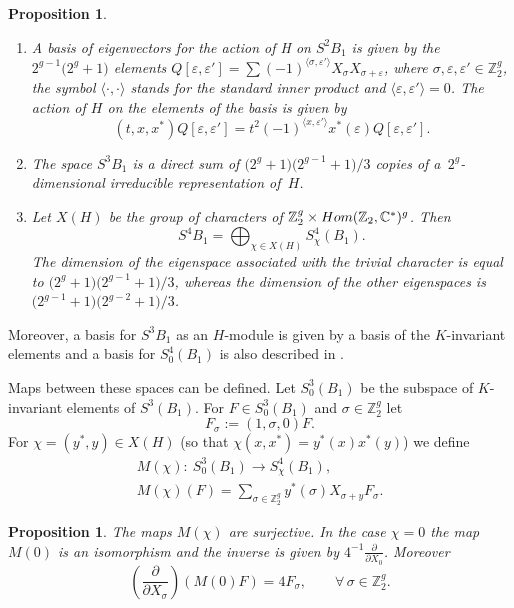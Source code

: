 \documentclass[11pt]{article}
\numberwithin{equation}{section}
\numberwithin{equation}{section}
\newtheorem{Proposition}[Theorem]{Proposition}
{ \theoremstyle{definition}
\newtheorem{Remark}[Theorem]{Remark} }
\newcommand{\ep}{\varepsilon}
\newcommand{\CC}{{\mathbb{C}}}
\newcommand{\ZZ}{{\mathbb{Z}}}
\def\ZZ{{\mathbb Z}}
\def\s{\sigma}
\begin{document}
\begin{Proposition}\label{pr.vG1}\quad
\begin{enumerate}\itemsep=0pt
\item[$(i)$] A basis of eigenvectors for the action of H on $S^2B_1$ is given by the $2^{g-1}\big( 2^{g}+1\big)$ elements $Q[\ep, \ep']=\sum(-1)^{\langle \s,\ep'\rangle}X_{\s}X_{\s+\ep}$, where $\s, \ep, \ep'\in\ZZ_2^g$, the symbol $\langle \cdot,\cdot\rangle$ stands for the standard inner product and $\langle \ep,\ep'\rangle=0$. The action of $H$ on the elements of the basis is given by
\[
(t, x, x^*)Q[\ep, \ep']=t^2(-1)^{\langle x,\ep'\rangle}x^*(\ep)Q[\ep, \ep'].
\]
\item[$(ii)$] The space $S^3B_1$ is a direct sum of $\big(2^g+1\big)\big(2^{g-1}+1\big)/3$ copies of a~$2^g$-dimensional irreducible representation of~$H$.
\item[$(iii)$]Let $X(H)$ be the group of characters of $\ZZ_{2}^g\times {\rm Hom}(\ZZ_{2}, \CC^{*})^g$. Then
\[
S^4B_1= \bigoplus_{\chi\in X(H)} S^4_{\chi}(B_1).
\]
The dimension of the eigenspace associated with the trivial character is equal to $\big(2^g+1\big)\big(2^{g-1}+1\big)/3$, whereas the dimension of the other eigenspaces is $\big(2^{g-1}+1\big)\big(2^{g-2}+1\big)/3$.
\end{enumerate}
\end{Proposition}

Moreover, a basis for $S^3B_1$ as an $H$-module is given by a basis of the $K$-invariant elements and a basis for $S^4_{0}(B_1)$ is also described in \cite{vG}.

Maps between these spaces can be defined. Let $S^3_{0}(B_1)$ be the subspace of $K$-invariant elements of $S^3(B_1)$.
 For $F\in S^3_{0}(B_1)$ and $ \s\in \ZZ_{2}^g$ let
\[
F_{\s}:=( 1, \s, 0)F.
\]
For $\chi=(y^*, y)\in X(H)$ (so that $\chi(x, x^*)=y^*(x)x^*(y)$) we define
\begin{gather*}
M(\chi)\colon \ S^3_{0}(B_1)\to S^4_{\chi}(B_1),\\
M(\chi)(F)= \sum_{\s\in \ZZ_{2}^g} y^*(\s)X_{\s+y}F_{\s}.
\end{gather*}

 \begin{Proposition} \label{pr.vG2}The maps $M(\chi)$ are surjective. In the case $\chi=0$ the map $M(0)$ is an isomorphism and the inverse is given by $ 4^{-1}\frac{\partial}{\partial X_0}$. Moreover
\[
\left(\frac{\partial}{\partial X_{\s}}\right)(M(0)F)=4F_{\s},\qquad \forall\, \s\in \ZZ_{2}^g.
\]
\end{Proposition}
\end{document}
